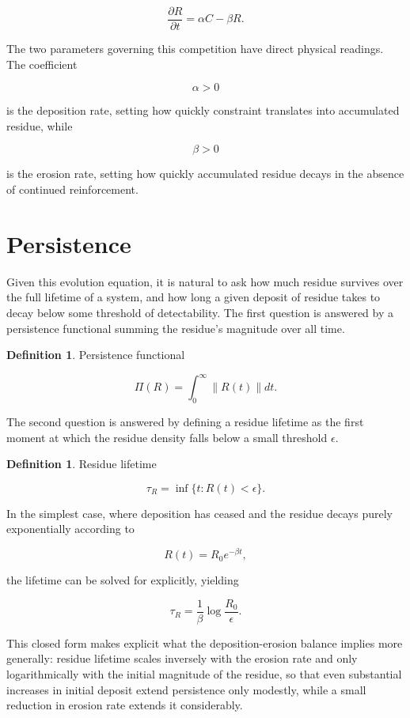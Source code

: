 \documentclass[11pt,oneside]{book}
\theoremstyle{plain}
\theoremstyle{definition}
\newtheorem{definition}[theorem]{Definition}
\theoremstyle{remark}
\begin{document}
\[
\frac{\partial R}{\partial t}
=
\alpha C
-
\beta R.
\]

The two parameters governing this competition have direct physical readings. The coefficient

\[
\alpha>0
\]

is the deposition rate, setting how quickly constraint translates into accumulated residue, while

\[
\beta>0
\]

is the erosion rate, setting how quickly accumulated residue decays in the absence of continued reinforcement.

\section{Persistence}

Given this evolution equation, it is natural to ask how much residue survives over the full lifetime of a system, and how long a given deposit of residue takes to decay below some threshold of detectability. The first question is answered by a persistence functional summing the residue's magnitude over all time.

\begin{definition}
Persistence functional

\[
\Pi(R)
=
\int_0^\infty
\|R(t)\|dt.
\]
\end{definition}

The second question is answered by defining a residue lifetime as the first moment at which the residue density falls below a small threshold \(\epsilon\).

\begin{definition}
Residue lifetime

\[
\tau_R
=
\inf
\{
t:R(t)<\epsilon
\}.
\]
\end{definition}

In the simplest case, where deposition has ceased and the residue decays purely exponentially according to

\[
R(t)=R_0e^{-\beta t},
\]

the lifetime can be solved for explicitly, yielding

\[
\tau_R
=
\frac1\beta
\log\frac{R_0}{\epsilon}.
\]

This closed form makes explicit what the deposition-erosion balance implies more generally: residue lifetime scales inversely with the erosion rate and only logarithmically with the initial magnitude of the residue, so that even substantial increases in initial deposit extend persistence only modestly, while a small reduction in erosion rate extends it considerably.
\end{document}
